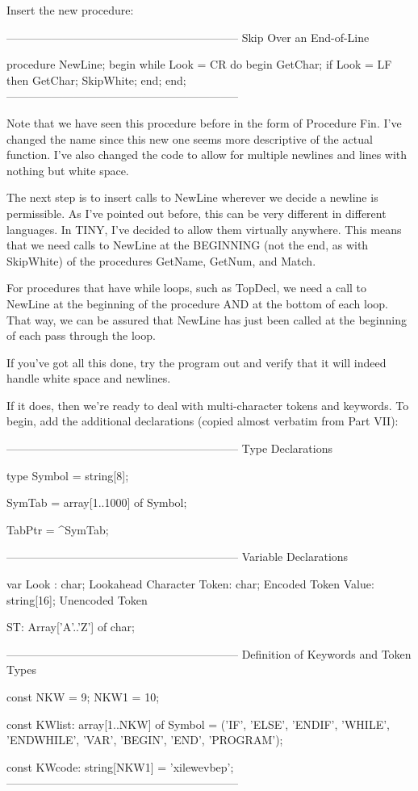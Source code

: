 \documentclass[float=false, crop=false]{standalone}
\begin{document}
Insert the new procedure:

\begin{code}
{--------------------------------------------------------------}
{ Skip Over an End-of-Line }

procedure NewLine;
begin
   while Look = CR do begin
      GetChar;
      if Look = LF then GetChar;
      SkipWhite;
   end;
end;
{--------------------------------------------------------------}
\end{code}

Note that we have seen this procedure before in the form of Procedure Fin. I've
changed the name since this new one seems more descriptive of the actual
function. I've also changed the code to allow for multiple newlines and lines
with nothing but white space.

The next step is to insert calls to NewLine wherever we decide a newline is
permissible. As I've pointed out before, this can be very different in different
languages. In TINY, I've decided to allow them virtually anywhere. This means
that we need calls to NewLine at the BEGINNING (not the end, as with SkipWhite)
of the procedures GetName, GetNum, and Match.

For procedures that have while loops, such as TopDecl, we need a call to NewLine
at the beginning of the procedure AND at the bottom of each loop. That way, we
can be assured that NewLine has just been called at the beginning of each pass
through the loop.

If you've got all this done, try the program out and verify that it will indeed
handle white space and newlines.

If it does, then we're ready to deal with multi-character tokens and keywords.
To begin, add the additional declarations (copied almost verbatim from Part
VII):

\begin{code}
{--------------------------------------------------------------}
{ Type Declarations }

type Symbol = string[8];

     SymTab = array[1..1000] of Symbol;

     TabPtr = ^SymTab;


{--------------------------------------------------------------}
{ Variable Declarations }

var Look : char;             { Lookahead Character }
    Token: char;             { Encoded Token       }
    Value: string[16];       { Unencoded Token     }

    ST: Array['A'..'Z'] of char;

{--------------------------------------------------------------}
{ Definition of Keywords and Token Types }

const NKW =   9;
      NKW1 = 10;

const KWlist: array[1..NKW] of Symbol =
              ('IF', 'ELSE', 'ENDIF', 'WHILE', 'ENDWHILE',
               'VAR', 'BEGIN', 'END', 'PROGRAM');

const KWcode: string[NKW1] = 'xilewevbep';
{--------------------------------------------------------------}
\end{code}
\end{document}
